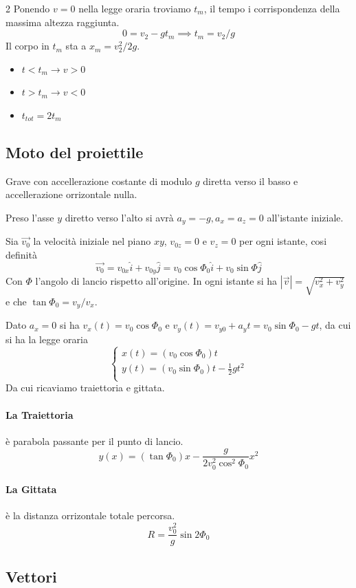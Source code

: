 \begin{multicols}{2}
	\noindent Ponendo $v=0$ nella legge oraria troviamo $t_m$, il tempo i corrispondenza della massima altezza raggiunta.\[0=v_2-gt_m\implies t_m=v_2/g\] Il corpo in $t_m$ sta a $x_m=v_2^2/2g$.
	\begin{itemize}
		\item $t<t_m\to v>0$
		\item $t>t_m\to v<0$
		\item $t_{tot}=2t_m$
	\end{itemize}
\end{multicols}
\subsection{Moto del proiettile}
Grave con accellerazione costante di modulo $g$ diretta verso il basso e accellerazione orrizontale nulla.

Preso l'asse $y$ diretto verso l'alto si avrà $a_y=-g, a_x=a_z=0$ all'istante iniziale.

Sia $\vec{v_0}$ la velocità iniziale nel piano $xy$, $v_{0z}=0$ e $v_z=0$ per ogni istante, cosi definità \[\vec{v_0}=v_{0x}\hat{i}+v_{0y}\hat{j}=v_0\cos\Phi_0\hat{i}+v_0\sin\Phi\hat{j}\] Con $\Phi$ l'angolo di lancio rispetto all'origine.
In ogni istante si ha $|\vec{v}|=\sqrt{v_x^2+v_y^2}$ e che $\tan\Phi_0=v_y/v_x$.

Dato $a_x=0$ si ha $v_x(t)=v_0\cos\Phi_0$ e $v_y(t)=v_{y0}+a_yt=v_0\sin\Phi_0-gt$, da cui si ha la legge oraria \[
\begin{cases}
	x(t)=(v_0\cos\Phi_0)t\\
	y(t)=(v_0\sin\Phi_0)t-\frac{1}{2}gt^2\\
\end{cases}
\] Da cui ricaviamo traiettoria e gittata.
\paragraph{La Traiettoria} è parabola passante per il punto di lancio. \[y(x)=(\tan\Phi_0)x-\frac{g}{2v_0^2\cos^2\Phi_0}x^2\]
\paragraph{La Gittata} è la distanza orrizontale totale percorsa. \[R=\frac{v_0^2}{g}\sin2\Phi_0\]


\subsection{Vettori}

